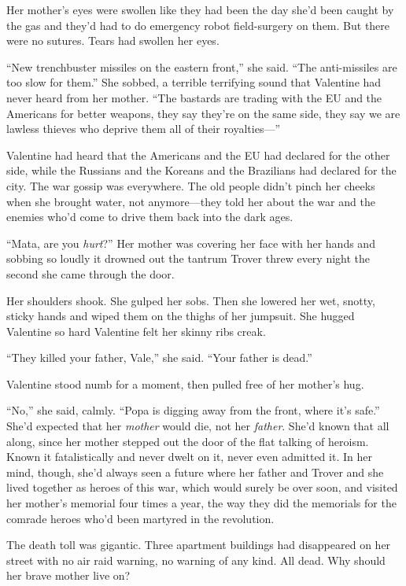 Her mother’s eyes were swollen like they had been the day she’d
been caught by the gas and they’d had to do emergency robot
field-surgery on them. But there were no sutures. Tears had swollen
her eyes.

“New trenchbuster missiles on the eastern front,” she said. “The
anti-missiles are too slow for them.” She sobbed, a terrible
terrifying sound that Valentine had never heard from her mother.
“The bastards are trading with the EU and the Americans for better
weapons, they say they’re on the same side, they say we are lawless
thieves who deprive them all of their royalties—”

Valentine had heard that the Americans and the EU had declared for
the other side, while the Russians and the Koreans and the
Brazilians had declared for the city. The war gossip was
everywhere. The old people didn’t pinch her cheeks when she brought
water, not anymore—they told her about the war and the enemies
who’d come to drive them back into the dark ages.

“Mata, are you \emph{hurt}?” Her mother was covering her face with
her hands and sobbing so loudly it drowned out the tantrum Trover
threw every night the second she came through the door.

Her shoulders shook. She gulped her sobs. Then she lowered her wet,
snotty, sticky hands and wiped them on the thighs of her jumpsuit.
She hugged Valentine so hard Valentine felt her skinny ribs creak.

“They killed your father, Vale,” she said. “Your father is dead.”

Valentine stood numb for a moment, then pulled free of her mother’s
hug.

“No,” she said, calmly. “Popa is digging away from the front, where
it’s safe.” She’d expected that her \emph{mother} would die, not
her \emph{father}. She’d known that all along, since her mother
stepped out the door of the flat talking of heroism. Known it
fatalistically and never dwelt on it, never even admitted it. In
her mind, though, she’d always seen a future where her father and
Trover and she lived together as heroes of this war, which would
surely be over soon, and visited her mother’s memorial four times a
year, the way they did the memorials for the comrade heroes who’d
been martyred in the revolution.

The death toll was gigantic. Three apartment buildings had
disappeared on her street with no air raid warning, no warning of
any kind. All dead. Why should her brave mother live on?

